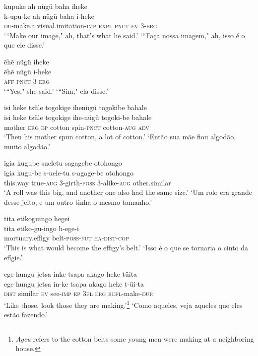 \documentclass[output=paper,
modfonts,nonflat
]{langsci/langscibook}
\begin{document}
\ea  kupuke ah nügü baha iheke\\[.3em]
\gll k-upu-ke ah nügü baha i-heke\\
     \textsc{du}-make.a.visual.imitation-\textsc{imp} \textsc{expl} \textsc{pnct} \textsc{ev} 3-\textsc{erg}\\
\glt ‘“Make our image," ah, that's what he said.’
\glt ‘“Faça nossa imagem," ah, isso é o que ele disse.’
\z

\ea  ẽhẽ nügü iheke\\[.3em]
\gll ẽhẽ nügü i-heke\\
     \textsc{aff} \textsc{pnct} 3-\textsc{erg}\\
\glt ‘“Yes," she said.’
\glt ‘“Sim," ela disse.’
\z

\ea  isi heke tsüle togokige ihenügü togokibe bahale\\[.3em]
\gll isi heke tsüle togokige ihe-nügü togoki-be bahale\\
     mother \textsc{erg} \textsc{ep} cotton spin-\textsc{pnct} cotton-\textsc{aug} \textsc{adv}\\
\glt ‘Then his mother spun cotton, a lot of cotton.’
\glt ‘Então sua mãe fiou algodão, muito algodão.’
\z

\ea  igia kugube sueletu sagagebe otohongo\\[.3em]
\gll igia kugu-be s-uele-tu s-agage-be otohongo\\
     this.way true-\textsc{aug} 3-girth-\textsc{poss} 3-alike-\textsc{aug} other.similar\\
\glt ‘A roll was this big, and another one also had the same size.’
\glt ‘Um rolo era grande desse jeito, e um outro tinha o mesmo tamanho.’
\z

\ea  tita etikoguingo hegei\\[.3em]
\gll tita etiko-gu-ingo h-ege-i\\
     mortuary.effigy belt-\textsc{poss}-\textsc{fut} \textsc{ha}-\textsc{dist}-\textsc{cop}\\
\glt ‘This is what would become the effigy's belt.’
\glt ‘Isso é o que se tornaria o cinto da efígie.’
\z

\ea  ege hungu jetsa inke tsapa akago heke tüita\\[.3em]
\gll ege hungu jetsa in-ke tsapa akago heke t-üi-ta\\
     \textsc{dist} similar \textsc{ev} see-\textsc{imp} \textsc{ep} 3\textsc{pl} \textsc{erg} \textsc{refl}-make-\textsc{dur}\\
\glt ‘Like those, look those they are making.’\footnote{\textit{Ageu} refers to the cotton belts some young men were making at a neighboring house.}
\glt ‘Como aqueles, veja aqueles que eles estão fazendo.’
\z
\end{document}
